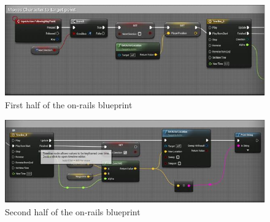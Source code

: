 \documentclass[11pt]{book}
\begin{document}
\begin{figure}
\caption{First half of the on-rails blueprint}
\centering
\includegraphics[scale=1.0]{moveToPoint.png}
\end{figure}

\begin{figure}
\caption{Second half of the on-rails blueprint}
\centering
\includegraphics[scale=1.0]{moveToPoint2.png}
\end{figure}
\end{document}
